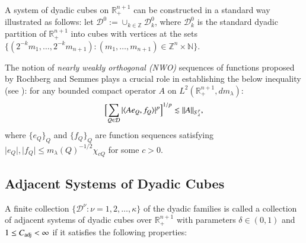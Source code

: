 \documentclass[12pt]{amsart}
\begin{document}
{\color{red}A
system of dyadic cubes on $\mathbb{R}_{+}^{n+1}$ can be constructed in a standard way illustrated as follows: let $\mathcal{D}^0:=\cup_{k\in\mathbb{Z}}\mathcal{D}_{k}^0$, where $\mathcal{D}_{k}^0$ is the standard dyadic partition of $\mathbb{R}_+^{n+1}$ into cubes with vertices at the sets $\{(2^{-k}m_1,\ldots,2^{-k}m_{n+1}):(m_1,\ldots,m_{n+1})\in\mathbb{Z}^{n}\times \mathbb{N}\}$.}

The notion of \emph{nearly weakly orthogonal  (NWO)} sequences of functions proposed by Rochberg and Semmes \cite{RS} plays a crucial role in establishing the below inequality (see \cite[(1.10), \S3]{RS}): for any
bounded compact operator $ A $ on $ L ^2 (\mathbb R_+^{n+1},dm_\lambda)$:
\begin{equation}\label{e:NWO}
\Bigl[
\sum_{Q\in \mathcal{D} } |\langle A e_Q, f_Q \rangle | ^{p}
\Bigr] ^{1/p} \lesssim \| A \| _{S_\lambda ^{p}},
\end{equation}
where $\{e_Q\}_Q$ and $\{f_Q\}_Q$ are function sequences satisfying $ \lvert  e_Q\rvert,  \lvert  f_Q\rvert  \leq m_\lambda(Q) ^{-1/2} \chi_{cQ} $ for some $c>0$.



\subsection{Adjacent Systems of Dyadic Cubes}\label{s3ss}

A
finite collection $\{\mathcal{D}^\nu\colon \nu=1,2,\ldots ,\kappa\}$ of the dyadic
families  is called a collection of
adjacent systems of dyadic cubes over $\mathbb{R}_{+}^{n+1}$ with parameters $\delta\in
(0,1) $ and $1\leq C_{\rm adj}<\infty$ if it satisfies the
following properties:
\end{document}
